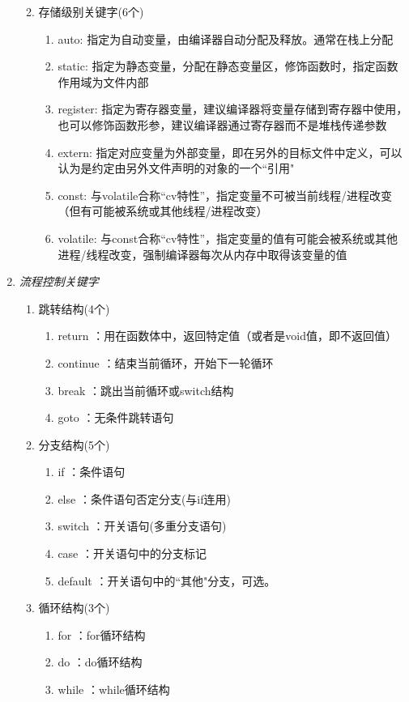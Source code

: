 \begin{enumerate}[label=\arabic*)]
\begin{enumerate}
\begin{enumerate}
		\end{enumerate}
		\item 存储级别关键字(6个)
		\begin{enumerate}
			\item auto: 指定为自动变量，由编译器自动分配及释放。通常在栈上分配
			\item static: 指定为静态变量，分配在静态变量区，修饰函数时，指定函数作用域为文件内部
			\item register: 指定为寄存器变量，建议编译器将变量存储到寄存器中使用，也可以修饰函数形参，建议编译器通过寄存器而不是堆栈传递参数
			\item extern: 指定对应变量为外部变量，即在另外的目标文件中定义，可以认为是约定由另外文件声明的对象的一个``引用"
			\item const: 与volatile合称“cv特性”，指定变量不可被当前线程/进程改变（但有可能被系统或其他线程/进程改变）
			\item volatile: 与const合称“cv特性”，指定变量的值有可能会被系统或其他进程/线程改变，强制编译器每次从内存中取得该变量的值
		\end{enumerate}	
	\end{enumerate}

	\item \emph{流程控制关键字}
	\begin{enumerate}
		\item 跳转结构(4个)
		\begin{enumerate}
			\item return ：用在函数体中，返回特定值（或者是void值，即不返回值）
			\item continue ：结束当前循环，开始下一轮循环
			\item break ：跳出当前循环或switch结构
			\item goto ：无条件跳转语句
		\end{enumerate}
		\item 分支结构(5个)
		\begin{enumerate}
			\item if ：条件语句
			\item else ：条件语句否定分支(与if连用)
			\item switch ：开关语句(多重分支语句)
			\item case ：开关语句中的分支标记
			\item default ：开关语句中的``其他"分支，可选。
		\end{enumerate}
		\item 循环结构(3个)
		\begin{enumerate}
			\item for ：for循环结构
			\item do ：do循环结构
			\item while ：while循环结构
		\end{enumerate}	
	\end{enumerate}
\end{enumerate}






